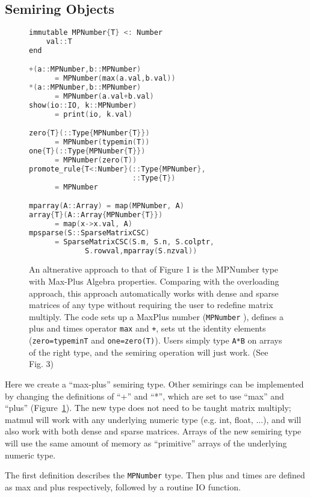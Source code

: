 \documentclass[conference]{IEEEtran}
\begin{document}
\subsection{Semiring Objects}

\begin{figure}
\begin{lstlisting}[language=c++, frame=single]
immutable MPNumber{T} <: Number
    val::T
end

+(a::MPNumber,b::MPNumber)
      = MPNumber(max(a.val,b.val))
*(a::MPNumber,b::MPNumber)
      = MPNumber(a.val+b.val)
show(io::IO, k::MPNumber)
      = print(io, k.val)

zero{T}(::Type{MPNumber{T}})
      = MPNumber(typemin(T))
one{T}(::Type{MPNumber{T}})
      = MPNumber(zero(T))
promote_rule{T<:Number}(::Type{MPNumber},
                        ::Type{T})
      = MPNumber

mparray(A::Array) = map(MPNumber, A)
array{T}(A::Array{MPNumber{T}})
      = map(x->x.val, A)
mpsparse(S::SparseMatrixCSC)
      = SparseMatrixCSC(S.m, S.n, S.colptr,
             S.rowval,mparray(S.nzval))
\end{lstlisting}
\label{fig:MP}
\caption{
An altnerative approach to that of Figure 1 is the 
MPNumber type with Max-Plus Algebra properties.  Comparing with the overloading
approach, this approach automatically works with dense and sparse matrices of any type without requiring the user to redefine matrix multiply.
The code sets up a MaxPlus number
({\tt MPNumber} ), defines a plus and times operator {\tt max} and {\tt +}, sets ut the identity elements ({\tt zero=typemin{T}} and {\tt one=zero(T)}). \newline
Users simply type {\tt A*B} on arrays of the right type, and the semiring operation will just work. (See Fig. 3)
}
\end{figure}

Here we create a ``max-plus'' semiring type.  Other semirings can be implemented
by changing the definitions of ``+'' and ``*'', which are set to use
``max'' and ``plus'' (Figure~\ref{fig:MP}).
The new type does not need to be taught matrix multiply; matmul will work with
any underlying numeric type (e.g. int, float, ...), and will also work with
both dense and sparse matrices. Arrays of the new semiring type will use the
same amount of memory as ``primitive'' arrays of the underlying numeric type.

The first definition describes the \verb+MPNumber+ type.
Then plus and times are defined as max and plus respectively, followed by
a routine IO function.
\end{document}
